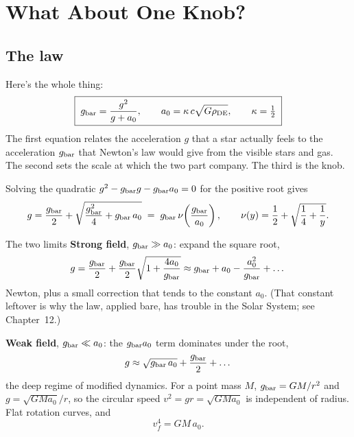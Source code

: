 \chapter{What About One Knob?}




\section{The law}

Here's the whole thing:
\begin{equation}
\boxed{\;g_{\rm bar}=\frac{g^2}{g+a_0},\qquad a_0=\kappa\,c\sqrt{G\rho_{\rm DE}},\qquad\kappa=\tfrac12\;}
\end{equation}
The first equation relates the acceleration $g$ that a star actually feels to the acceleration $g_{\rm bar}$ that Newton's law would give from the visible stars and gas. The second sets the scale at which the two part company. The third is the knob.

Solving the quadratic $g^2-g_{\rm bar} g-g_{\rm bar} a_0=0$ for the positive root gives
\begin{equation}
g=\frac{g_{\rm bar}}{2}+\sqrt{\frac{g_{\rm bar}^2}{4}+g_{\rm bar}\,a_0}\;=\;g_{\rm bar}\,\nu\!\left(\frac{g_{\rm bar}}{a_0}\right),\qquad\nu(y)=\frac12+\sqrt{\frac14+\frac1y}.
\end{equation}


\begin{mathbox}{The two limits}
\textbf{Strong field}, $g_{\rm bar}\gg a_0$: expand the square root,
\[
g=\frac{g_{\rm bar}}{2}+\frac{g_{\rm bar}}{2}\sqrt{1+\frac{4a_0}{g_{\rm bar}}}\approx g_{\rm bar}+a_0-\frac{a_0^2}{g_{\rm bar}}+\dots
\]
Newton, plus a small correction that tends to the constant $a_0$. (That constant leftover is why the law, applied bare, has trouble in the Solar System; see Chapter~12.)

\textbf{Weak field}, $g_{\rm bar}\ll a_0$: the $g_{\rm bar} a_0$ term dominates under the root,
\[
g\approx\sqrt{g_{\rm bar}\,a_0}+\frac{g_{\rm bar}}{2}+\dots
\]
the deep regime of modified dynamics. For a point mass $M$, $g_{\rm bar}=GM/r^2$ and $g=\sqrt{GMa_0}/r$, so the circular speed $v^2=gr=\sqrt{GMa_0}$ is independent of radius. Flat rotation curves, and
\[
v_f^4=GM\,a_0.
\]
\end{mathbox}

